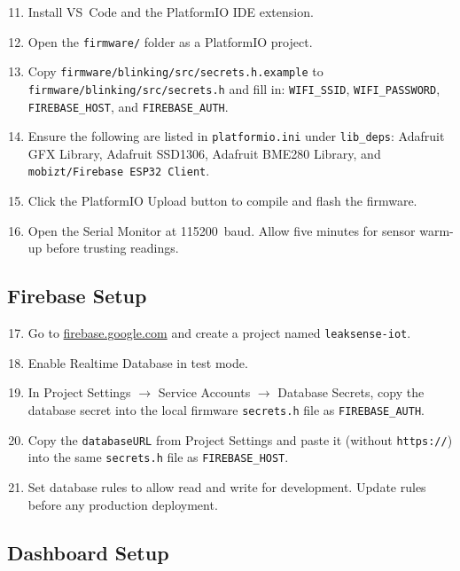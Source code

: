 \documentclass[a4paper,10pt,conference,onecolumn]{IEEEtran}
\begin{document}
\begin{enumerate}
  \setcounter{enumi}{10}
  \item Install VS~Code and the PlatformIO IDE extension.
  \item Open the \texttt{firmware/} folder as a PlatformIO project.
  \item Copy \texttt{firmware/blinking/src/secrets.h.example} to
        \texttt{firmware/blinking/src/secrets.h} and fill in:
        \texttt{WIFI\_SSID}, \texttt{WIFI\_PASSWORD},
        \texttt{FIREBASE\_HOST}, and \texttt{FIREBASE\_AUTH}.
  \item Ensure the following are listed in \texttt{platformio.ini} under
        \texttt{lib\_deps}: Adafruit GFX Library, Adafruit SSD1306, Adafruit
        BME280 Library, and \texttt{mobizt/Firebase~ESP32~Client}.
  \item Click the PlatformIO Upload button to compile and flash the firmware.
  \item Open the Serial Monitor at 115200~baud. Allow five minutes for sensor
        warm-up before trusting readings.
\end{enumerate}

\subsection{Firebase Setup}

\begin{enumerate}
  \setcounter{enumi}{16}
  \item Go to \url{firebase.google.com} and create a project named
        \texttt{leaksense-iot}.
  \item Enable Realtime Database in test mode.
  \item In Project Settings $\to$ Service Accounts $\to$ Database Secrets,
        copy the database secret into the local firmware
        \texttt{secrets.h} file as \texttt{FIREBASE\_AUTH}.
  \item Copy the \texttt{databaseURL} from Project Settings and paste it
        (without \texttt{https://}) into the same \texttt{secrets.h} file as
        \texttt{FIREBASE\_HOST}.
  \item Set database rules to allow read and write for development. Update
        rules before any production deployment.
\end{enumerate}

\subsection{Dashboard Setup}
\end{document}
